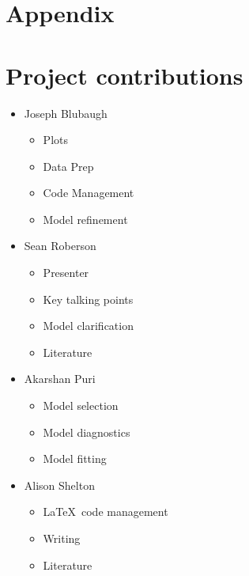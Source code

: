 \documentclass[twoside,twocolumn]{article}
\begin{document}

\begin{flushleft}
\end{flushleft}
 \section*{Appendix}
 \appendix
 \section*{Project contributions}
 \begin{itemize}
 	\item Joseph Blubaugh
 		\begin{itemize}
 			\item Plots
 			\item Data Prep
 			\item Code Management
 			\item Model refinement
 		\end{itemize}
 		
 	\item Sean Roberson
 	 		\begin{itemize}
 			\item Presenter
 			\item Key talking points
 			\item Model clarification
 			\item Literature
 		\end{itemize}
 	
	\item Akarshan Puri
			\begin{itemize}
 			\item Model selection
 			\item Model diagnostics
 			\item Model fitting
 		\end{itemize}
 	
 	\item Alison Shelton
 			\begin{itemize}
 				\item \LaTeX \ code management
 				\item Writing
 				\item Literature
 			\end{itemize}
	

\end{itemize}
\end{document}
